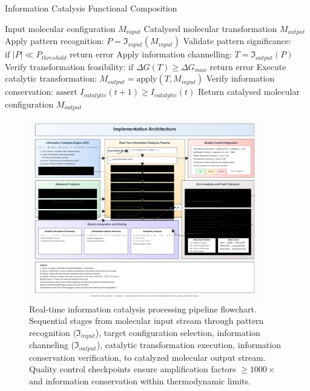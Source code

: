 \documentclass[12pt,a4paper]{article}
\begin{document}
\begin{algorithm}[H]
\caption{Information Catalysis Functional Composition}
\begin{algorithmic}[1]
\REQUIRE Input molecular configuration $M_{input}$
\ENSURE Catalysed molecular transformation $M_{output}$
\STATE Apply pattern recognition: $P = \mathfrak{I}_{input}(M_{input})$
\STATE Validate pattern significance: $\text{if } |P| \ll P_{threshold} \text{ return error}$
\STATE Apply information channelling: $T = \mathfrak{I}_{output}(P)$
\STATE Verify transformation feasibility: $\text{if } \Delta G(T) \ge \Delta G_{max} \text{ return error}$
\STATE Execute catalytic transformation: $M_{output} = \text{apply}(T, M_{input})$
\STATE Verify information conservation: $\text{assert } I_{catalytic}(t+1) \geq I_{catalytic}(t)$
\STATE Return catalysed molecular configuration $M_{output}$
\end{algorithmic}
\end{algorithm}
\begin{figure}[H]
    \centering
    \includegraphics[width=0.9\textwidth]{images/implementation.pdf}
    \caption{Real-time information catalysis processing pipeline flowchart. Sequential stages from molecular input stream through pattern recognition ($\mathfrak{I}_{input}$), target configuration selection, information channeling ($\mathfrak{I}_{output}$), catalytic transformation execution, information conservation verification, to catalyzed molecular output stream. Quality control checkpoints ensure amplification factors $\geq 1000\times$ and information conservation within thermodynamic limits.}
    \label{fig:catalysis_pipeline}
\end{figure}
\end{document}
